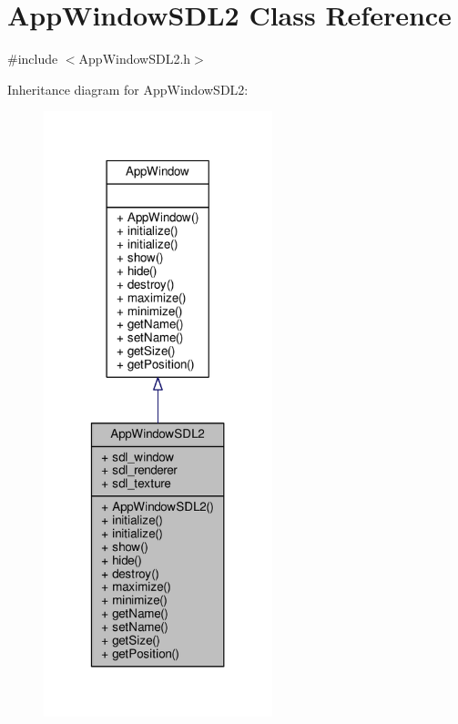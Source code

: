\hypertarget{classAppWindowSDL2}{\section{App\-Window\-S\-D\-L2 Class Reference}
\label{classAppWindowSDL2}
}


{\ttfamily \#include $<$App\-Window\-S\-D\-L2.\-h$>$}



Inheritance diagram for App\-Window\-S\-D\-L2\-:
\nopagebreak
\begin{figure}[H]
\begin{center}
\leavevmode
\includegraphics[width=188pt]{classAppWindowSDL2__inherit__graph}
\end{center}
\end{figure}


